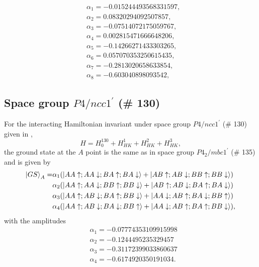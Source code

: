 \documentclass[prb,aps,amssymb,twocolumn,notitlepage]{revtex4-2}
\def\sg135{$P4_2/mbc1^\prime$ (\# 135)}
\def\sgb{$P4/ncc1^\prime$ (\# 130) }
\begin{document}
\begin{align}
&\alpha_{1}=-0.015244493568331597,\nonumber \\
&\alpha_{2}=0.08320294092507857,\nonumber \\
&\alpha_{3}=-0.07514072175059767,\nonumber \\
&\alpha_{4}=0.002815471666648206,\nonumber \\
&\alpha_{5}=-0.14266271433303265,\nonumber \\
&\alpha_{6}=0.057070353250615435,\nonumber \\
&\alpha_{7}=-0.2813020658633854,\nonumber \\
&\alpha_{8}=-0.603040898093542,\nonumber
\end{align}

\subsection{Space group \sgb}
\label{sec:sg130}
For the interacting Hamiltonian invariant under space group \sgb given in ,
\begin{equation}
    H=H^{130}_{0}+H^{1}_{HK}+H^{2}_{HK}+H^{3}_{HK},
\end{equation}
the ground state at the $A$ point is the same as in space group \sg135 and is given by
\begin{align}
\ket{GS}_{A}=&\alpha_{1}(\ket{AA\uparrow;AA\downarrow;BA\uparrow;BA\downarrow}+\ket{AB\uparrow;AB\downarrow;BB\uparrow;BB\downarrow}) \\
&\alpha_{2}(\ket{AA\uparrow;AA\downarrow;BB\uparrow;BB\downarrow}+\ket{AB\uparrow;AB\downarrow;BA\uparrow;BA\downarrow}) \nonumber \\
&\alpha_{3}(\ket{AA\uparrow;AB\downarrow;BA\uparrow;BB\downarrow}+\ket{AA\downarrow;AB\uparrow;BA\downarrow;BB\uparrow}) \nonumber \\
&\alpha_{4}(\ket{AA\uparrow;AB\downarrow;BA\downarrow;BB\uparrow}+\ket{AA\downarrow;AB\uparrow;BA\uparrow;BB\downarrow}) \nonumber,
\end{align}
with the amplitudes
\begin{align}
&\alpha_{1}=-0.07774353109915998\nonumber \\
&\alpha_{2}=-0.1244495235329457\nonumber \\
&\alpha_{3}=-0.31172399033860637\nonumber \\
&\alpha_{4}=-0.6174920350191034\nonumber.
\end{align}
\end{document}
